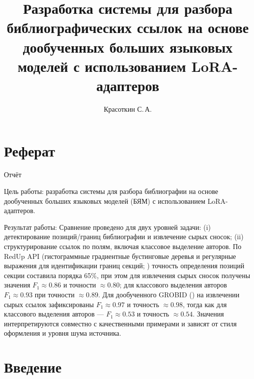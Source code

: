 \documentclass{mipt-thesis-ms}
\title{Разработка системы для разбора библиографических ссылок на основе дообученных больших языковых моделей с использованием LoRA-адаптеров}
\author{Красоткин С.\,А.}
\begin{document}
\frontmatter

\titlecontents

\chapter{Реферат}
Отчёт

Цель работы: разработка системы для разбора библиографии на основе дообученных больших языковых моделей (БЯМ) с использованием LoRA-адаптеров.

Результат работы: Сравнение проведено для двух уровней задачи: (i) детектирование позиций/границ библиографии и извлечение сырых сносок; (ii) структурирование ссылок по полям, включая классовое выделение авторов. По RedUp API (гистограммные градиентные бустинговые деревья и регулярные выражения для идентификации границ секций; \cite{kopanichuk}) точность определения позиций секции составила порядка 65\%, при этом для извлечения сырых сносок получены значения $F_1\approx0{.}86$ и точности $\approx0{.}80$; для классового выделения авторов $F_1\approx0{.}93$ при точности $\approx0{.}89$. Для дообученного GROBID (\cite{kiryanov}) на извлечении сырых ссылок зафиксированы $F_1\approx0{.}97$ и точность $\approx0{.}98$, тогда как для классового выделения авторов — $F_1\approx0{.}53$ и точность $\approx0{.}54$. Значения интерпретируются совместно с качественными примерами и зависят от стиля оформления и уровня шума источника.

\mainmatter


\chapter{Введение}
\end{document}
